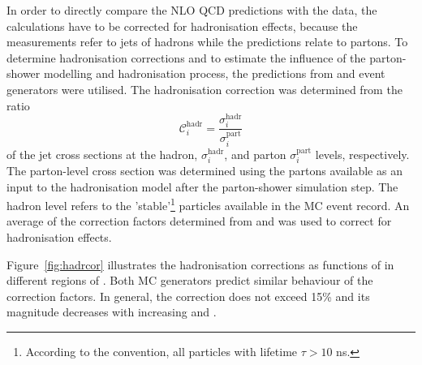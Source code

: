 In order to directly compare the NLO QCD predictions with the data, the calculations have to be corrected for hadronisation effects, because the measurements refer to jets of hadrons while the predictions relate to partons. To determine hadronisation corrections and to estimate the influence of the parton-shower modelling and hadronisation process, the predictions from \ariadne and \lepto event generators were utilised. The hadronisation correction was determined from the ratio 
\begin{equation}
 \mathcal{C}^\text{hadr}_i = \frac{\sigma_i^\text{hadr}}{\sigma_i^\text{part}}
 \label{eq:hadrcor}
\end{equation}
of the jet cross sections at the hadron, $\sigma_i^\text{hadr}$, and parton $\sigma_i^\text{part}$ levels, respectively. The parton-level cross section was determined using the partons available as an input to the hadronisation model after the parton-shower simulation step. The hadron level refers to the 'stable'\footnote{According to the \zeus convention, all particles with lifetime $\tau > 10$ ns.} particles available in the MC event record. An average of the correction factors determined from \ariadne and \lepto was used to correct for hadronisation effects.

Figure~\ref{fig:hadrcor} illustrates the hadronisation corrections as functions of \etjetb in different regions of \qsq. Both MC generators predict similar behaviour of the correction factors. In general, the correction does not exceed 15\% and its magnitude decreases with increasing \etjetb and \qsq.



